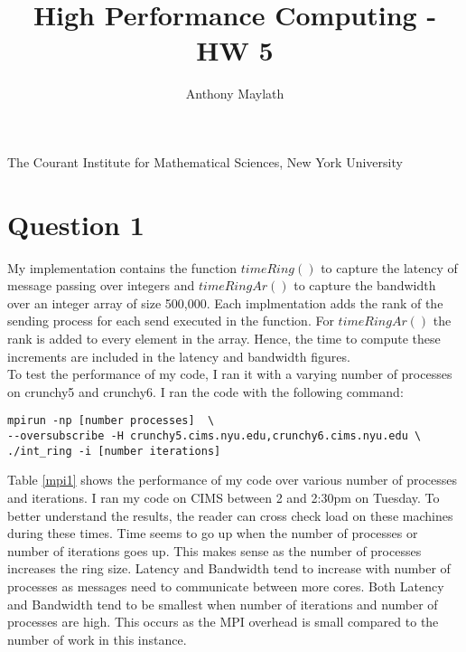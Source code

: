 \documentclass{article}
\title{High Performance Computing - HW 5}
\author{Anthony Maylath}
\begin{document}
\maketitle

\begin{center}

The Courant Institute for Mathematical Sciences, New York University \\ 

\end{center}


\setcounter{MaxMatrixCols}{13}

\section{Question 1}

My implementation contains the function $timeRing()$ to capture the latency of message passing over integers and $timeRingAr()$ to capture the bandwidth over an integer array of size 500,000. Each implmentation adds the rank of the sending process for each send executed in the function. For $timeRingAr()$ the rank is added to every element in the array. Hence, the time to compute these increments are included in the latency and bandwidth figures.\\

To test the performance of my code, I ran it with a varying number of processes on crunchy5 and crunchy6. I ran the code with the following command:\\

\begin{lstlisting}
mpirun -np [number processes]  \ 
--oversubscribe -H crunchy5.cims.nyu.edu,crunchy6.cims.nyu.edu \
./int_ring -i [number iterations]
\end{lstlisting}

Table \ref{mpi1} shows the performance of my code over various number of processes and iterations. I ran my code on CIMS between 2 and 2:30pm on Tuesday. To better understand the results, the reader can cross check load on these machines during these times. Time seems to go up when the number of processes or number of iterations goes up. This makes sense as the number of processes increases the ring size. Latency and Bandwidth tend to increase with number of processes as messages need to communicate between more cores. Both Latency and Bandwidth tend to be smallest when number of iterations and number of processes are high. This occurs as the MPI overhead is small compared to the number of work in this instance.
\end{document}
